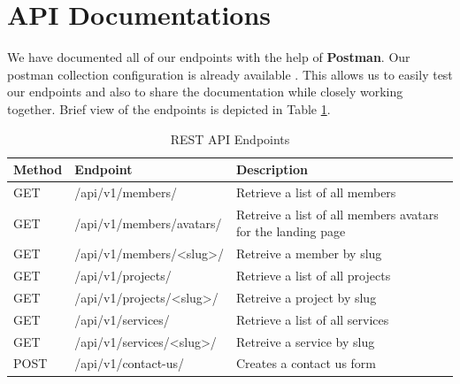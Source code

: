\section{API Documentations}
We have documented all of our endpoints with the help of \textbf{Postman}.
Our postman collection configuration is already available \href{https://api.postman.com/collections/8585418-bc188eb6-bb3e-4c84-94e9-4ba6ab9a8a80?access_key=PMAT-01J309WW0GVKMFHF6XSXX982ZG}{}.
This allows us to easily test our endpoints and also to share the documentation while closely working together.
Brief view of the endpoints is depicted in Table \ref{table:endpoints}.
\\

\begin{table}[h!]
    \centering
    \begin{tabular}{| m{2cm} | m{5cm} | m{6cm} |}
    \hline
    \textbf{Method} & \textbf{Endpoint} & \textbf{Description} \\
    \hline
    GET & /api/v1/members/ & Retrieve a list of all members \\
    \hline
    GET & /api/v1/members/avatars/ & Retreive a list of all members avatars for the landing page \\
    \hline
    GET & /api/v1/members/<slug>/ & Retreive a member by slug \\
    \hline
    GET & /api/v1/projects/ & Retrieve a list of all projects \\
    \hline
    GET & /api/v1/projects/<slug>/ & Retreive a project by slug \\
    \hline
    GET & /api/v1/services/ & Retrieve a list of all services \\
    \hline
    GET & /api/v1/services/<slug>/ & Retreive a service by slug \\
    \hline
    POST & /api/v1/contact-us/ & Creates a contact us form \\
    \hline
    \end{tabular}
    \caption{REST API Endpoints}
    \label{table:endpoints}
\end{table}
